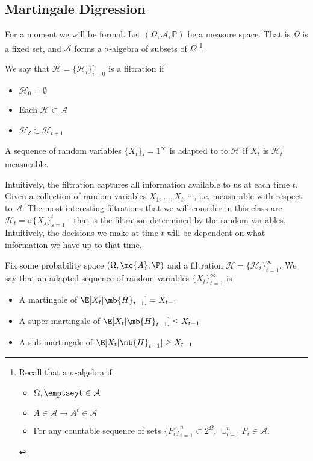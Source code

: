 
\subsection{Martingale Digression}

For a moment we will be formal. Let $(\Omega, \mathcal{A}, \mathbb{P})$ be a measure space. That is $\Omega$ is a fixed set, and $\mathcal{A}$ forms a $\sigma$-algebra of subsets of $\Omega$ \footnote{Recall that a $\sigma$-algebra if \begin{itemize}\item $\Omega, \emptseyt\in \mathcal{A}$ \item $A\in \mathcal{A} \rightarrow A^c\in \mathcal{A}$ \item For any countable sequence of sets $\{F_i\}_{i=1}^n\subset 2^{\Omega}$, $\cup_{i=1}^n F_i\in \mathcal{A}$. \end{itemize}}

\begin{definition}
We say that $\mathcal{H} = \{\mathcal{H}_i\}_{i=0}^n$ is a filtration if 
\begin{itemize}
    \item $\mathcal{H}_0 = \emptyset $
    \item Each $\mathcal{H}\subset \mathcal{A}$
    \item $\mathcal{H_t}\subset \mathcal{H}_{t+1}$
\end{itemize}

A sequence of random variables $\{X_t\}_t=1^{\infty}$ is adapted to to $\mathcal{H}$ if $X_t$ is $\mathcal{H}_t$ measurable. 
\end{definition}
Intuitively, the filtration captures all information available to us at each time $t$. Given a collection of random variables $X_1, \dots, X_t, \cdots$, i.e. measurable with respect to $\mathcal{A}$. The most interesting filtrations that we will consider in this class are $\mathcal{H}_t = \sigma\{X_{s}\}_{s=1}^t$ - that is the filtration determined by the random variables. Intuitively, the decisions we make at time $t$ will be dependent on what information we have up to that time. 

\begin{definition}
    Fix some probability space $(\Omega, \mc{A}, \P)$ and a filtration $\mathcal{H} = \{\mathcal{H}_t\}_{t=1}^{\infty}$. We say that an adapted sequence of random variables $\{X_t\}_{t=1}^{\infty}$ is 
    \begin{itemize}
        \item A martingale of $\E[X_{t}|\mb{H}_{t-1}] = X_{t-1}$
        \item A super-martingale of $\E[X_{t}|\mb{H}_{t-1}] \leq X_{t-1}$
        \item A sub-martingale of $\E[X_{t}|\mb{H}_{t-1}] \geq X_{t-1}$
    \end{itemize}    
\end{definition}


